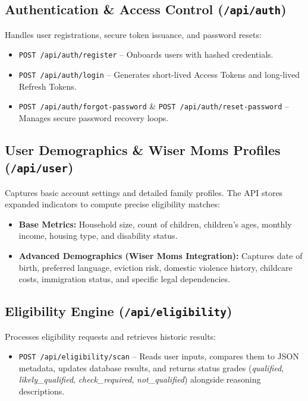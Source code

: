 \documentclass[11pt,a4paper]{article}
\begin{document}
\subsection{Authentication \& Access Control (\texttt{/api/auth})}
Handles user registrations, secure token issuance, and password resets:
\begin{itemize}
    \item \texttt{POST /api/auth/register} -- Onboards users with hashed credentials.
    \item \texttt{POST /api/auth/login} -- Generates short-lived Access Tokens and long-lived Refresh Tokens.
    \item \texttt{POST /api/auth/forgot-password} \& \texttt{POST /api/auth/reset-password} -- Manages secure password recovery loops.
\end{itemize}

\subsection{User Demographics \& Wiser Moms Profiles (\texttt{/api/user})}
Captures basic account settings and detailed family profiles. The API stores expanded indicators to compute precise eligibility matches:
\begin{itemize}
    \item \textbf{Base Metrics:} Household size, count of children, children's ages, monthly income, housing type, and disability status.
    \item \textbf{Advanced Demographics (Wiser Moms Integration):} Captures date of birth, preferred language, eviction risk, domestic violence history, childcare costs, immigration status, and specific legal dependencies.
\end{itemize}

\subsection{Eligibility Engine (\texttt{/api/eligibility})}
Processes eligibility requests and retrieves historic results:
\begin{itemize}
    \item \texttt{POST /api/eligibility/scan} -- Reads user inputs, compares them to JSON metadata, updates database results, and returns status grades (\textit{qualified}, \textit{likely\_qualified}, \textit{check\_required}, \textit{not\_qualified}) alongside reasoning descriptions.
\end{itemize}
\end{document}
